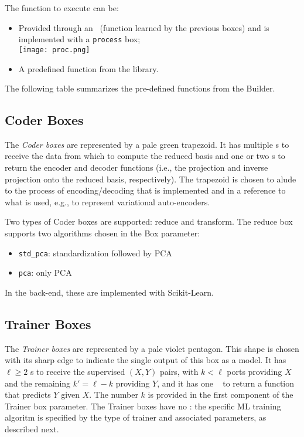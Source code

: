 The function to execute can be:
\begin{itemize}
    \item Provided through an \IFP~(function learned by the previous boxes) and is implemented with a \verb|process| box; \\
    \texttt{[image: proc.png]}
    \item A predefined function from the {\Builder} library.
\end{itemize}

The following table summarizes the pre-defined functions from the Builder.



\subsection{Coder Boxes}

The {\em Coder boxes} are represented by a pale green trapezoid. It has multiple \IDP s to receive the data from which to compute the reduced basis and one or two \OFP s to return the encoder and decoder functions (i.e., the projection and inverse projection onto the reduced basis, respectively). 
The trapezoid is chosen to alude to the process of encoding/decoding that is implemented and in a reference to what is used, e.g., to represent variational auto-encoders. 

Two types of Coder boxes are supported: reduce and transform. 
The reduce box supports two algorithms chosen in the Box parameter:
\begin{itemize}
    \item \verb|std_pca|: standardization followed by PCA
    \item \verb|pca|: only PCA
\end{itemize}
In the back-end, these are implemented with Scikit-Learn.



\subsection{Trainer Boxes}
The {\em Trainer boxes} are represented by a pale violet pentagon. 
This shape is chosen with its sharp edge to indicate the single output of this box as a model. It has $\ell \geq 2$ \IDP s to receive the supervised $(X, Y)$ pairs, with $k < \ell$ ports providing $X$ and the remaining $k'=\ell-k$ providing $Y$, and it has one \OFP~ to return a function that predicts $Y$ given $X$. The number $k$ is provided in the first component of the Trainer box parameter. The Trainer boxes have no \IFP: the specific ML training algoritm is specified by the type of trainer and associated parameters, as described next. 

